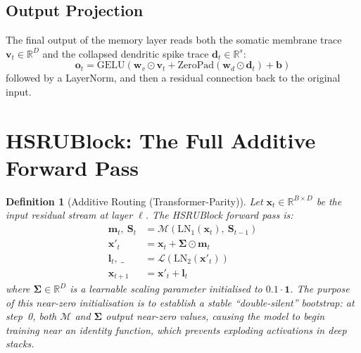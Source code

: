 \documentclass[11pt]{article}
\newtheorem{definition}{Definition}[section]
\begin{document}
\subsection{Output Projection}

The final output of the memory layer reads both the somatic membrane trace $\mathbf{v}_t \in \mathbb{R}^D$ and the collapsed dendritic spike trace $\mathbf{d}_t \in \mathbb{R}^s$:
\begin{equation}
    \mathbf{o}_t = \mathrm{GELU}\!\left( \mathbf{w}_v \odot \mathbf{v}_t + \mathrm{ZeroPad}(\mathbf{w}_d \odot \mathbf{d}_t) + \mathbf{b} \right)
\end{equation}
followed by a LayerNorm, and then a residual connection back to the original input.

\section{HSRUBlock: The Full Additive Forward Pass}

\begin{definition}[Additive Routing (Transformer-Parity)]
Let $\mathbf{x}_t \in \mathbb{R}^{B \times D}$ be the input residual stream at layer $\ell$. The HSRUBlock forward pass is:
\begin{align}
    \mathbf{m}_t,\ \mathbf{S}_t &= \mathcal{M}\!\left(\mathrm{LN}_1(\mathbf{x}_t),\ \mathbf{S}_{t-1}\right) \\
    \mathbf{x}'_t &= \mathbf{x}_t + \boldsymbol{\Sigma} \odot \mathbf{m}_t \\
    \mathbf{l}_t,\ \_ &= \mathcal{L}\!\left(\mathrm{LN}_2(\mathbf{x}'_t)\right) \\
    \mathbf{x}_{t+1} &= \mathbf{x}'_t + \mathbf{l}_t
\end{align}
where $\boldsymbol{\Sigma} \in \mathbb{R}^D$ is a learnable scaling parameter initialised to $0.1 \cdot \mathbf{1}$. The purpose of this near-zero initialisation is to establish a stable ``double-silent'' bootstrap: at step~0, both $\mathcal{M}$ and $\boldsymbol{\Sigma}$ output near-zero values, causing the model to begin training near an identity function, which prevents exploding activations in deep stacks.
\end{definition}
\end{document}
